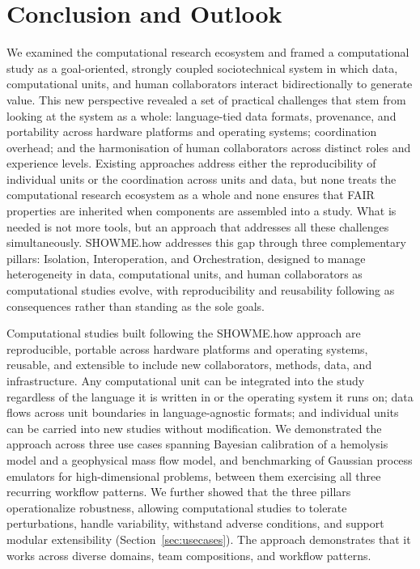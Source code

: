 \documentclass{eceasst}
\begin{document}



\section{Conclusion and Outlook}
\label{sec:conclusion}

We examined the computational research ecosystem and framed a computational
study as a goal-oriented, strongly coupled sociotechnical system in which data,
computational units, and human collaborators interact bidirectionally to
generate value. This new perspective revealed a set of practical challenges that
stem from looking at the system as a whole: language-tied data formats,
provenance, and portability across hardware platforms and operating systems;
coordination overhead; and the
harmonisation of human collaborators across distinct roles and experience
levels. Existing approaches address either the reproducibility of individual
units or the coordination across units and data, but none treats the
computational research ecosystem as a whole and none ensures that FAIR
properties are inherited when components are assembled into a study. What is
needed is not more tools, but an approach that addresses all these challenges
simultaneously. SHOWME.how addresses this gap through three complementary
pillars: Isolation, Interoperation, and Orchestration, designed to manage
heterogeneity in data, computational units, and human collaborators as
computational studies evolve, with reproducibility and reusability following as
consequences rather than standing as the sole goals.

Computational studies built following the SHOWME.how approach are reproducible,
portable across hardware platforms and operating systems, reusable, and
extensible to include new collaborators, methods, data, and infrastructure. Any
computational unit can be integrated into the study regardless of the language
it is written in or the operating system it runs on; data flows across unit
boundaries in language-agnostic formats; and individual units can be carried
into new studies without modification. We demonstrated the approach across three use cases spanning Bayesian
calibration of a hemolysis model and a geophysical mass flow model, and
benchmarking of Gaussian process emulators for high-dimensional problems, between them
exercising all three recurring workflow patterns. We
further showed that the three pillars operationalize robustness, allowing
computational studies to tolerate perturbations, handle variability, withstand
adverse conditions, and support modular extensibility
(Section~\ref{sec:usecases}). The approach demonstrates that it works across
diverse domains, team compositions, and workflow patterns.
\end{document}
